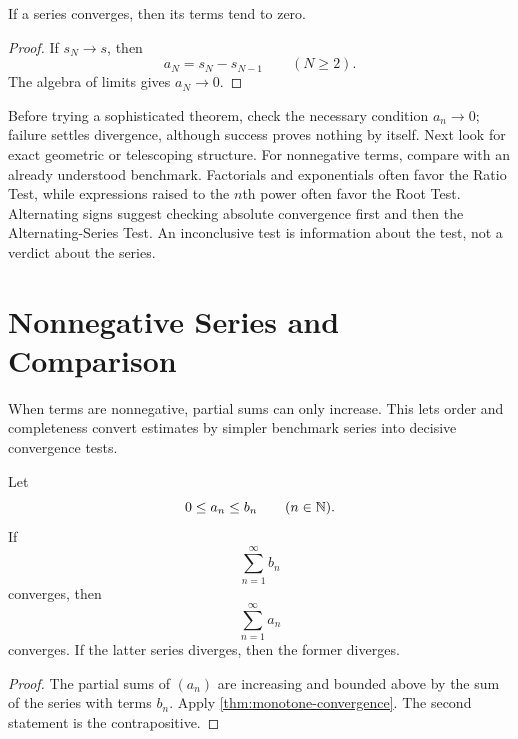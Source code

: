 \begin{proposition}
\label{prop:series-terms-zero}
If a series converges, then its terms tend to zero.
\end{proposition}
\begin{proof}
If $s_N\to s$, then
\[
a_N=s_N-s_{N-1}
\qquad(N\geq2).
\]
The algebra of limits gives $a_N\to0$.
\end{proof}

\begin{remark}
Before trying a sophisticated theorem, check the necessary condition
$a_n\to0$; failure settles divergence, although success proves nothing by
itself.  Next look for exact geometric or telescoping structure.  For
nonnegative terms, compare with an already understood benchmark.  Factorials
and exponentials often favor the Ratio Test, while expressions raised to the
$n$th power often favor the Root Test.  Alternating signs suggest checking
absolute convergence first and then the Alternating-Series Test.  An
inconclusive test is information about the test, not a verdict about the
series.
\end{remark}

\section{Nonnegative Series and Comparison}

When terms are nonnegative, partial sums can only increase.  This lets order
and completeness convert estimates by simpler benchmark series into decisive
convergence tests.

\begin{theorem}
\label{thm:comparison-test}
Let
\[
0\leq a_n\leq b_n
\qquad(n\in\mathbb{N}).
\]
If
\[
\sum_{n=1}^{\infty}b_n
\]
converges, then
\[
\sum_{n=1}^{\infty}a_n
\]
converges. If the latter series diverges, then the former diverges.
\end{theorem}
\begin{proof}
The partial sums of $(a_n)$ are increasing and bounded above by the sum of the series with terms $b_n$. Apply \cref{thm:monotone-convergence}. The second statement is the contrapositive.
\end{proof}

